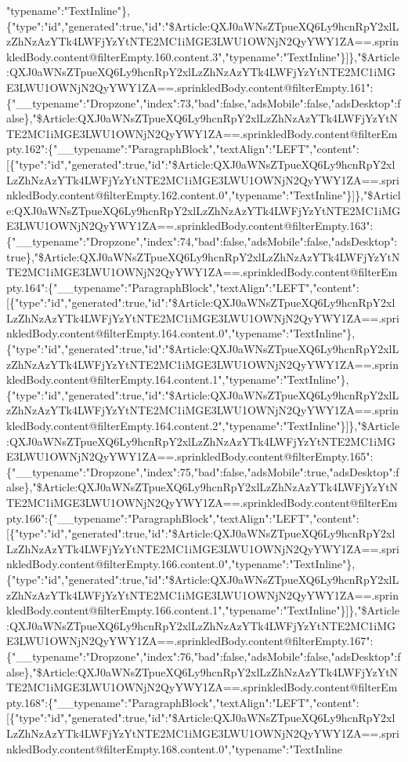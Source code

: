 "typename":"TextInline"\},\{"type":"id","generated":true,"id":"\$Article:QXJ0aWNsZTpueXQ6Ly9hcnRpY2xlLzZhNzAzYTk4LWFjYzYtNTE2MC1iMGE3LWU1OWNjN2QyYWY1ZA==.sprinkledBody.content@filterEmpty.160.content.3","typename":"TextInline"\}{]}\},"\$Article:QXJ0aWNsZTpueXQ6Ly9hcnRpY2xlLzZhNzAzYTk4LWFjYzYtNTE2MC1iMGE3LWU1OWNjN2QyYWY1ZA==.sprinkledBody.content@filterEmpty.161":\{"\_\_typename":"Dropzone","index":73,"bad":false,"adsMobile":false,"adsDesktop":false\},"\$Article:QXJ0aWNsZTpueXQ6Ly9hcnRpY2xlLzZhNzAzYTk4LWFjYzYtNTE2MC1iMGE3LWU1OWNjN2QyYWY1ZA==.sprinkledBody.content@filterEmpty.162":\{"\_\_typename":"ParagraphBlock","textAlign":"LEFT","content":{[}\{"type":"id","generated":true,"id":"\$Article:QXJ0aWNsZTpueXQ6Ly9hcnRpY2xlLzZhNzAzYTk4LWFjYzYtNTE2MC1iMGE3LWU1OWNjN2QyYWY1ZA==.sprinkledBody.content@filterEmpty.162.content.0","typename":"TextInline"\}{]}\},"\$Article:QXJ0aWNsZTpueXQ6Ly9hcnRpY2xlLzZhNzAzYTk4LWFjYzYtNTE2MC1iMGE3LWU1OWNjN2QyYWY1ZA==.sprinkledBody.content@filterEmpty.163":\{"\_\_typename":"Dropzone","index":74,"bad":false,"adsMobile":false,"adsDesktop":true\},"\$Article:QXJ0aWNsZTpueXQ6Ly9hcnRpY2xlLzZhNzAzYTk4LWFjYzYtNTE2MC1iMGE3LWU1OWNjN2QyYWY1ZA==.sprinkledBody.content@filterEmpty.164":\{"\_\_typename":"ParagraphBlock","textAlign":"LEFT","content":{[}\{"type":"id","generated":true,"id":"\$Article:QXJ0aWNsZTpueXQ6Ly9hcnRpY2xlLzZhNzAzYTk4LWFjYzYtNTE2MC1iMGE3LWU1OWNjN2QyYWY1ZA==.sprinkledBody.content@filterEmpty.164.content.0","typename":"TextInline"\},\{"type":"id","generated":true,"id":"\$Article:QXJ0aWNsZTpueXQ6Ly9hcnRpY2xlLzZhNzAzYTk4LWFjYzYtNTE2MC1iMGE3LWU1OWNjN2QyYWY1ZA==.sprinkledBody.content@filterEmpty.164.content.1","typename":"TextInline"\},\{"type":"id","generated":true,"id":"\$Article:QXJ0aWNsZTpueXQ6Ly9hcnRpY2xlLzZhNzAzYTk4LWFjYzYtNTE2MC1iMGE3LWU1OWNjN2QyYWY1ZA==.sprinkledBody.content@filterEmpty.164.content.2","typename":"TextInline"\}{]}\},"\$Article:QXJ0aWNsZTpueXQ6Ly9hcnRpY2xlLzZhNzAzYTk4LWFjYzYtNTE2MC1iMGE3LWU1OWNjN2QyYWY1ZA==.sprinkledBody.content@filterEmpty.165":\{"\_\_typename":"Dropzone","index":75,"bad":false,"adsMobile":true,"adsDesktop":false\},"\$Article:QXJ0aWNsZTpueXQ6Ly9hcnRpY2xlLzZhNzAzYTk4LWFjYzYtNTE2MC1iMGE3LWU1OWNjN2QyYWY1ZA==.sprinkledBody.content@filterEmpty.166":\{"\_\_typename":"ParagraphBlock","textAlign":"LEFT","content":{[}\{"type":"id","generated":true,"id":"\$Article:QXJ0aWNsZTpueXQ6Ly9hcnRpY2xlLzZhNzAzYTk4LWFjYzYtNTE2MC1iMGE3LWU1OWNjN2QyYWY1ZA==.sprinkledBody.content@filterEmpty.166.content.0","typename":"TextInline"\},\{"type":"id","generated":true,"id":"\$Article:QXJ0aWNsZTpueXQ6Ly9hcnRpY2xlLzZhNzAzYTk4LWFjYzYtNTE2MC1iMGE3LWU1OWNjN2QyYWY1ZA==.sprinkledBody.content@filterEmpty.166.content.1","typename":"TextInline"\}{]}\},"\$Article:QXJ0aWNsZTpueXQ6Ly9hcnRpY2xlLzZhNzAzYTk4LWFjYzYtNTE2MC1iMGE3LWU1OWNjN2QyYWY1ZA==.sprinkledBody.content@filterEmpty.167":\{"\_\_typename":"Dropzone","index":76,"bad":false,"adsMobile":false,"adsDesktop":false\},"\$Article:QXJ0aWNsZTpueXQ6Ly9hcnRpY2xlLzZhNzAzYTk4LWFjYzYtNTE2MC1iMGE3LWU1OWNjN2QyYWY1ZA==.sprinkledBody.content@filterEmpty.168":\{"\_\_typename":"ParagraphBlock","textAlign":"LEFT","content":{[}\{"type":"id","generated":true,"id":"\$Article:QXJ0aWNsZTpueXQ6Ly9hcnRpY2xlLzZhNzAzYTk4LWFjYzYtNTE2MC1iMGE3LWU1OWNjN2QyYWY1ZA==.sprinkledBody.content@filterEmpty.168.content.0","typename":"TextInline